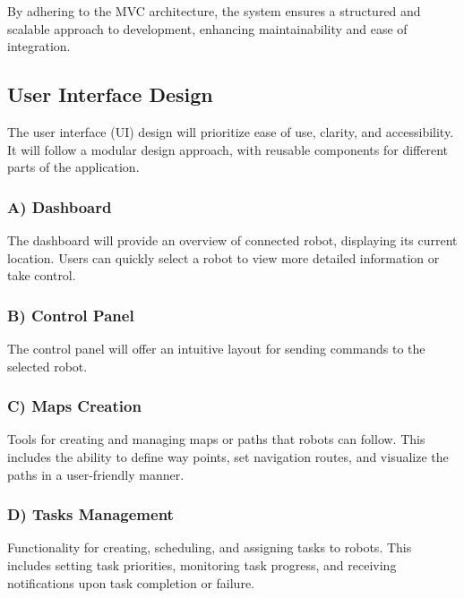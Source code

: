 By adhering to the MVC architecture, the system ensures a structured and scalable approach to development, enhancing maintainability and ease of integration.
\subsection{User Interface Design}
\vspace{-1.5mm}
The user interface (UI) design will prioritize ease of use, clarity, and accessibility. It will follow a modular design approach, with reusable components for different parts of the application.
\vspace{-1.5mm}

\subsubsection{A) Dashboard}
\vspace{-1mm}
The dashboard will provide an overview of connected robot, displaying its current location. Users can quickly select a robot to view more detailed information or take control.
\vspace{-1mm}
\subsubsection{B) Control Panel}
\vspace{-1mm}
The control panel will offer an intuitive layout for sending commands to the selected robot.
\vspace{-5mm}
\subsubsection{C) Maps Creation}
\vspace{-1mm}
Tools for creating and managing maps or paths that robots can follow. This includes the ability to define way points, set navigation routes, and visualize the paths in a user-friendly manner.
\newpage
\subsubsection{D) Tasks Management}
\vspace{-1mm}
 Functionality for creating, scheduling, and assigning tasks to robots. This includes setting task priorities, monitoring task progress, and receiving notifications upon task completion or failure.
\vspace{-1mm}
